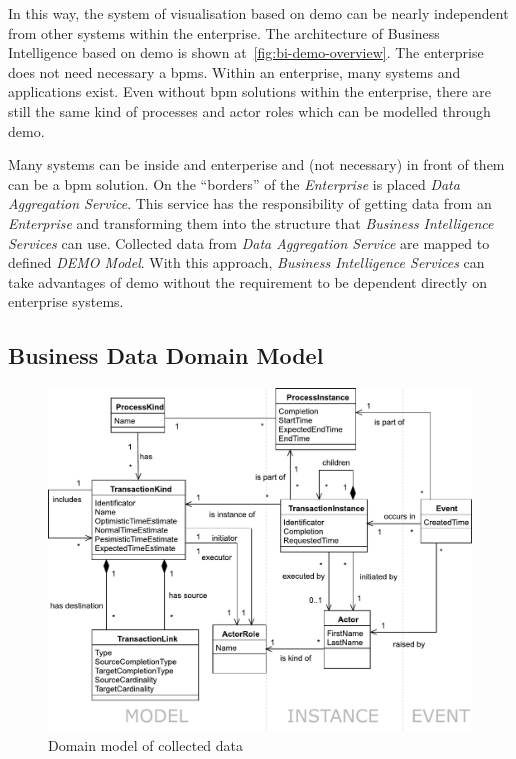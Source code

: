 In this way, the system of visualisation based on \gls{demo} can be nearly independent from other systems within the enterprise. The architecture of Business Intelligence based on \gls{demo} is shown at~\cref{fig:bi-demo-overview}. The enterprise does not need necessary a \gls{bpms}. Within an enterprise, many systems and applications exist. Even without \gls{bpm} solutions within the enterprise, there are still the same kind of processes and actor roles which can be modelled through \gls{demo}.

Many systems can be inside and enterperise and (not necessary) in front of them can be a \gls{bpm} solution. On the ``borders'' of the \textit{Enterprise} is placed \textit{Data Aggregation Service}. This service has the responsibility of getting data from an \textit{Enterprise} and transforming them into the structure that \textit{Business Intelligence Services} can use. Collected data from \textit{Data Aggregation Service} are mapped to defined \textit{DEMO Model}.
With this approach, \textit{Business Intelligence Services} can take advantages of \gls{demo} without the requirement to be dependent directly on enterprise systems.
\subsection{Business Data Domain Model}
\begin{figure}[ht!]
  \centering
  \includegraphics[width=13cm,keepaspectratio]{img/domain-data-model}
  \caption{Domain model of collected data}
  \label{fig:domain-data-model}
\end{figure}    

